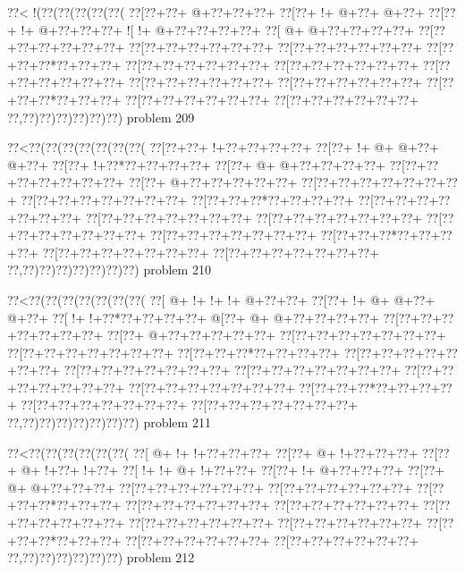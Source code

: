 \vbox{\vbox{\goo
\0??<\- !(\0??(\0??(\0??(\0??(\0??(
\0??[\0??+\0??+\- @+\0??+\0??+\0??+
\0??[\0??+\- !+\- @+\0??+\- @+\0??+
\0??[\0??+\- !+\- @+\0??+\0??+\0??+
\- ![\- !+\- @+\0??+\0??+\0??+\0??+
\0??[\- @+\- @+\0??+\0??+\0??+\0??+
\0??[\0??+\0??+\0??+\0??+\0??+\0??+
\0??[\0??+\0??+\0??+\0??+\0??+\0??+
\0??[\0??+\0??+\0??+\0??+\0??+\0??+
\0??[\0??+\0??+\0??*\0??+\0??+\0??+
\0??[\0??+\0??+\0??+\0??+\0??+\0??+
\0??[\0??+\0??+\0??+\0??+\0??+\0??+
\0??[\0??+\0??+\0??+\0??+\0??+\0??+
\0??[\0??+\0??+\0??+\0??+\0??+\0??+
\0??[\0??+\0??+\0??+\0??+\0??+\0??+
\0??[\0??+\0??+\0??*\0??+\0??+\0??+
\0??[\0??+\0??+\0??+\0??+\0??+\0??+
\0??[\0??+\0??+\0??+\0??+\0??+\0??+
\0??,\0??)\0??)\0??)\0??)\0??)\0??)
}
\hfil problem 209\hfil\break
}

\vbox{\vbox{\goo
\0??<\0??(\0??(\0??(\0??(\0??(\0??(\0??(
\0??[\0??+\0??+\- !+\0??+\0??+\0??+\0??+
\0??[\0??+\- !+\- @+\- @+\0??+\- @+\0??+
\0??[\0??+\- !+\0??*\0??+\0??+\0??+\0??+
\0??[\0??+\- @+\- @+\0??+\0??+\0??+\0??+
\0??[\0??+\0??+\0??+\0??+\0??+\0??+\0??+
\0??[\0??+\- @+\0??+\0??+\0??+\0??+\0??+
\0??[\0??+\0??+\0??+\0??+\0??+\0??+\0??+
\0??[\0??+\0??+\0??+\0??+\0??+\0??+\0??+
\0??[\0??+\0??+\0??*\0??+\0??+\0??+\0??+
\0??[\0??+\0??+\0??+\0??+\0??+\0??+\0??+
\0??[\0??+\0??+\0??+\0??+\0??+\0??+\0??+
\0??[\0??+\0??+\0??+\0??+\0??+\0??+\0??+
\0??[\0??+\0??+\0??+\0??+\0??+\0??+\0??+
\0??[\0??+\0??+\0??+\0??+\0??+\0??+\0??+
\0??[\0??+\0??+\0??*\0??+\0??+\0??+\0??+
\0??[\0??+\0??+\0??+\0??+\0??+\0??+\0??+
\0??[\0??+\0??+\0??+\0??+\0??+\0??+\0??+
\0??,\0??)\0??)\0??)\0??)\0??)\0??)\0??)
}
\hfil problem 210\hfil\break
}

\vbox{\vbox{\goo
\0??<\0??(\0??(\0??(\0??(\0??(\0??(\0??(
\0??[\- @+\- !+\- !+\- !+\- @+\0??+\0??+
\0??[\0??+\- !+\- @+\- @+\0??+\- @+\0??+
\0??[\- !+\- !+\0??*\0??+\0??+\0??+\0??+
\- @[\0??+\- @+\- @+\0??+\0??+\0??+\0??+
\0??[\0??+\0??+\0??+\0??+\0??+\0??+\0??+
\0??[\0??+\- @+\0??+\0??+\0??+\0??+\0??+
\0??[\0??+\0??+\0??+\0??+\0??+\0??+\0??+
\0??[\0??+\0??+\0??+\0??+\0??+\0??+\0??+
\0??[\0??+\0??+\0??*\0??+\0??+\0??+\0??+
\0??[\0??+\0??+\0??+\0??+\0??+\0??+\0??+
\0??[\0??+\0??+\0??+\0??+\0??+\0??+\0??+
\0??[\0??+\0??+\0??+\0??+\0??+\0??+\0??+
\0??[\0??+\0??+\0??+\0??+\0??+\0??+\0??+
\0??[\0??+\0??+\0??+\0??+\0??+\0??+\0??+
\0??[\0??+\0??+\0??*\0??+\0??+\0??+\0??+
\0??[\0??+\0??+\0??+\0??+\0??+\0??+\0??+
\0??[\0??+\0??+\0??+\0??+\0??+\0??+\0??+
\0??,\0??)\0??)\0??)\0??)\0??)\0??)\0??)
}
\hfil problem 211\hfil\break
}

\vbox{\vbox{\goo
\0??<\0??(\0??(\0??(\0??(\0??(\0??(
\0??[\- @+\- !+\- !+\0??+\0??+\0??+
\0??[\0??+\- @+\- !+\0??+\0??+\0??+
\0??[\0??+\- @+\- !+\0??+\- !+\0??+
\0??[\- !+\- !+\- @+\- !+\0??+\0??+
\0??[\0??+\- !+\- @+\0??+\0??+\0??+
\0??[\0??+\- @+\- @+\0??+\0??+\0??+
\0??[\0??+\0??+\0??+\0??+\0??+\0??+
\0??[\0??+\0??+\0??+\0??+\0??+\0??+
\0??[\0??+\0??+\0??*\0??+\0??+\0??+
\0??[\0??+\0??+\0??+\0??+\0??+\0??+
\0??[\0??+\0??+\0??+\0??+\0??+\0??+
\0??[\0??+\0??+\0??+\0??+\0??+\0??+
\0??[\0??+\0??+\0??+\0??+\0??+\0??+
\0??[\0??+\0??+\0??+\0??+\0??+\0??+
\0??[\0??+\0??+\0??*\0??+\0??+\0??+
\0??[\0??+\0??+\0??+\0??+\0??+\0??+
\0??[\0??+\0??+\0??+\0??+\0??+\0??+
\0??,\0??)\0??)\0??)\0??)\0??)\0??)
}
\hfil problem 212\hfil\break
}

